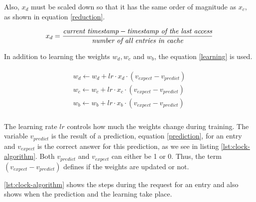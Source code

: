\documentclass[
	12pt,
	a4paper,
	abstract,
	bibliography=totoc,
	chapterprefix,
	headings=openright,
	numbers=endperiod,
	parskip=half,
	twoside,
]{scrreprt}
\begin{document}
Also, $x_d$ must be scaled down so that it has the same order of magnitude as $x_c$, as shown in equation \ref{reduction}.

\begin{align}
	x_d = \frac{\emph{current timestamp} - \emph{timestamp of the last access}}{\emph{number of all entries in cache}} \label{reduction}
\end{align}
	
In addition to learning the weights $w_d, w_c$ and $w_b$, the equation \ref{learning} is used.

\begin{align}
\begin{split}
	w_d \leftarrow w_d + lr \cdot x_d \cdot (v_{expect} - v_{predict})\\
	w_c \leftarrow w_c + lr \cdot x_c \cdot (v_{expect} - v_{predict})\\
	w_b \leftarrow w_b + lr \cdot x_b \cdot (v_{expect} - v_{predict})\\
\end{split} \label{learning}
\end{align}

The learning rate $lr$ controls how much the weights change during training.
The variable $v_{predict}$ is the result of a prediction, equation \ref{prediction}, for an entry and 
$v_{expect}$ is the correct answer for this prediction, as we see in listing \ref{lst:clock-algorithm}.
Both $v_{predict}$ and $v_{expect}$ can either be 1 or 0.
Thus, the term $(v_{expect} - v_{predict})$ defines if the weights are updated or not.


\cref{lst:clock-algorithm} shows the steps during the request for an entry and also shows when 
the prediction and the learning take place.

\bigskip
\end{document}
